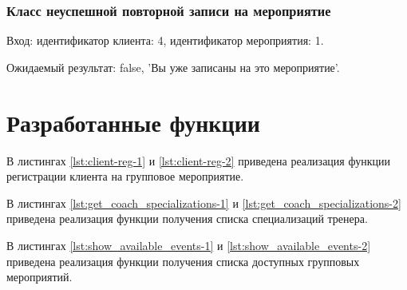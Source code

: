 \newpage

\subsubsection{Класс неуспешной повторной записи на мероприятие}

Вход: идентификатор клиента: 4, идентификатор мероприятия: 1.

Ожидаемый результат: false, 'Вы уже записаны на это мероприятие'.

\section{Разработанные функции}

В листингах \ref{lst:client-reg-1} и \ref{lst:client-reg-2} приведена реализация функции регистрации клиента на групповое мероприятие.



\newpage



В листингах \ref{lst:get_coach_specializations-1} и \ref{lst:get_coach_specializations-2} приведена реализация функции получения списка специализаций тренера.





В листингах \ref{lst:show_available_events-1} и \ref{lst:show_available_events-2} приведена реализация функции получения списка доступных групповых мероприятий.


\newpage


